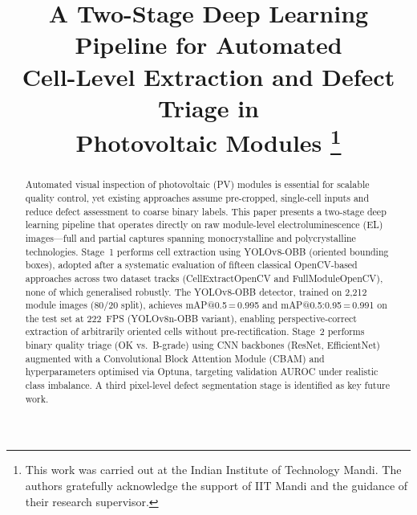 \documentclass[conference]{IEEEtran}
\begin{document}
\title{A Two-Stage Deep Learning Pipeline for Automated\\
Cell-Level Extraction and Defect Triage in\\
Photovoltaic Modules%
\thanks{This work was carried out at the Indian Institute of
Technology Mandi. The authors gratefully acknowledge the
support of IIT Mandi and the guidance of their research
supervisor.}
}

\author{%
\and
{}
}

\maketitle

\begin{abstract}
Automated visual inspection of photovoltaic (PV) modules is
essential for scalable quality control, yet existing approaches
assume pre-cropped, single-cell inputs and reduce defect
assessment to coarse binary labels.
This paper presents a two-stage deep learning pipeline that
operates directly on raw module-level electroluminescence (EL)
images---full and partial captures spanning monocrystalline and
polycrystalline technologies.
Stage~1 performs cell extraction using YOLOv8-OBB (oriented
bounding boxes), adopted after a systematic evaluation of
fifteen classical OpenCV-based approaches across two dataset
tracks (CellExtractOpenCV and FullModuleOpenCV),
none of which generalised robustly.
The YOLOv8-OBB detector, trained on 2{,}212 module images
(80/20 split), achieves mAP@0.5\,=\,0.995 and
mAP@0.5:0.95\,=\,0.991 on the test set at 222~FPS (YOLOv8n-OBB
variant), enabling perspective-correct extraction of arbitrarily
oriented cells without pre-rectification.
Stage~2 performs binary quality triage (OK vs.\ B-grade)
using CNN backbones (ResNet, EfficientNet) augmented with a
Convolutional Block Attention Module (CBAM) and
hyperparameters optimised via Optuna, targeting validation
AUROC under realistic class imbalance.
A third pixel-level defect segmentation stage is identified
as key future work.
\end{abstract}
\end{document}
